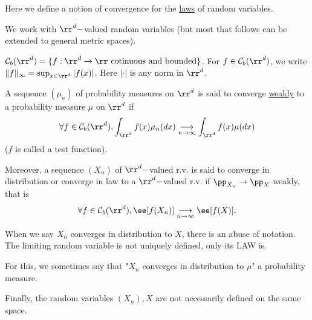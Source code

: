 \documentclass[../main.tex]{subfiles}
\begin{document}
Here we define a notion of convergence for the \underline{laws} of random
variables.

\vspace{0.5em}

We work with $\rr^d-$valued random variables (but most that follows can be
extended to general metric spaces).

\begin{notation}
  $\mathcal{C}_b(\rr^d) = \{ f: \rr^d \to \rr \text{ cotinuous and bounded}\}
  $. For $f \in \mathcal{C}_b(\rr^d)$, we write $\| f \|_{\infty} = \sup_{x
  \in \rr^d} |f(x)|$. Here $|\cdot|$ is any norm in $\rr^d$.
\end{notation}

\begin{definition}
  A sequence $(\mu_n)$ of probability measures on $\rr^d$ is said to converge
  \underline{weakly} to a probability measure $\mu$ on $\rr^d$ if $$\forall f
  \in \mathcal{C}_b(\rr^d), \int_{\rr^d} f(x)\mu_n(dx) \underset{n \to \infty}{\longrightarrow} \int_{\rr^d}
  f(x)\mu(dx) $$
  ($f$ is called a test function).

  Moreover, a sequence $(X_n)$ of $\rr^d-$valued r.v. is said to converge in
  distribution or converge in law to a $\rr^d-$valued r.v. if $\pp_{X_n} \to
  \pp_X$ weakly, that is
  \[
    \forall f \in \mathcal{C}_b(\rr^d), \ee[f(X_n)] \underset{n \to
    \infty}{\longrightarrow}\ee[f(X)]
  .\] 
\end{definition}
\begin{remark}
    When we say $X_n$ converges in distribution to $X$, there is an abuse of
    notation. The limiting random variable is not uniquely defined, only its
    LAW is.

    For this, we sometimes say that "$X_n$ converges in distribution to $\mu$"
    a probability measure.

    Finally, the random variables $(X_n), X$ are not necessarily defined on
    the same space.
\end{remark}
\end{document}

